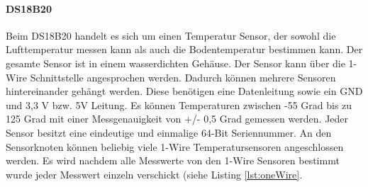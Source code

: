 \paragraph{DS18B20} Beim DS18B20 handelt es sich um einen Temperatur Sensor, der sowohl die Lufttemperatur messen kann als auch die Bodentemperatur bestimmen kann. Der gesamte Sensor ist in einem wasserdichten Gehäuse. Der Sensor kann über die 1-Wire Schnittstelle angesprochen werden. Dadurch können mehrere Sensoren hintereinander gehängt werden. Diese benötigen eine Datenleitung sowie ein GND und 3,3 V bzw. 5V Leitung. Es können Temperaturen zwischen -55 Grad bis zu 125 Grad mit einer Messgenauigkeit von +/- 0,5 Grad gemessen werden. Jeder Sensor besitzt eine eindeutige und einmalige 64-Bit Seriennummer. An den Sensorknoten können beliebig viele 1-Wire Temperatursensoren angeschlossen werden. Es wird nachdem alle Messwerte von den 1-Wire Sensoren bestimmt wurde jeder Messwert einzeln verschickt (siehe Listing \ref{lst:oneWire}.

